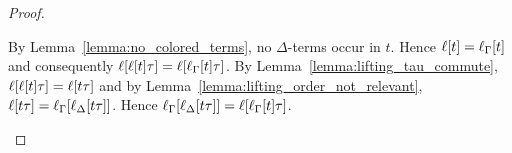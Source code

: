 \documentclass[,%
	draft=false,%
	numbers=noendperiod
	11pt,
	a4paper,
	oneside,%
	openany,
]{memoir}
\begin{document}
\begin{proof}
\begin{description}
			By Lemma~\ref{lemma:no_colored_terms}, no $\Delta$-terms occur in $t$.
			Hence 
			$\ell[t] = \ell_{\Gamma}[t]$ and consequently
			$\ell[\ell[t]\tau] = \ell[\ell_{\Gamma}[t]\tau]$.
			By Lemma~\ref{lemma:lifting_tau_commute}, $\ell[\ell[t]\tau] = \ell[t\tau]$ and by Lemma~\ref{lemma:lifting_order_not_relevant}, $\ell[t\tau] = \ell_{\Gamma}[\ell_{\Delta}[t\tau]]$.
			Hence $\ell_{\Gamma}[\ell_{\Delta}[t\tau]] = \ell[\ell_{\Gamma}[t]\tau]$.
			\begin{comment}
				Hence it suffices to show that for a literal $\lambda$ in $\LIde(C_i)$ or $\LIclde(C_i)$ and its corresponding literal $\kappa$ in $\LI(C_i)$ or $\LIcl(C_i)$ for some $C_i \in \bbar C$
				that $\lifgammanovar{ \lifdeltanovar{\lambda\tau} } = \lifboth{\kappa\tau}$.

				By the induction hypothesis, $\lifgammanovar{\lambda} = \kappa$.
				By Lemma~\ref{lemma:no_colored_terms}, no $\Delta$-terms occur in $\lambda$.
				Hence 
				$\lifboth{\lambda} = \kappa$ and also
				$\lifboth{\lifboth{\lambda}\tau} = \lifboth{\kappa\tau}$.
				By Lemma~\ref{lemma:lifting_tau_commute},
				$\lifboth{\lambda\tau} = \lifboth{\kappa\tau}$, 
				which by Lemma~\ref{lemma:lifting_order_not_relevant} is nothing else than
				$\lifgammanovar{\lifdeltanovar{\lambda\tau}} = \lifboth{\kappa\tau}$.
			\end{comment}
			\begin{comment}

				For the induction step, it suffices to show that for a literal $\lambda$ with $\lifgammanovar{\lambda} = \kappa$
				that $\lifgammanovar{\lifdeltanovar{\lambda} \tau} = \lifboth{\kappa\tau}$.

				We abbreviate\
				$C_1\setminus \{l\}$ by $C_1^*$ and
				$C_2\setminus \{\lnot l'\}$ by $C_2^*$.

				Note that each literal in $\LIclde(C)$ is of the form $\lifdeltanovar{\lambda\tau}$ for some literal $\lambda$ in $\LIclde(C_1)$ or $\LIclde(C_2)$.
				Hence by the induction hypothesis, $\lifgammanovar{\lambda}$ is contained in $\LIcl(C_1)$ or $\LIcl(C_1)$.
				Note that every literal in $\LIcl(C)$ is of this form $\lifboth{\lifgammanovar{\lambda}\tau}$ for some $\lambda$ in $\LIclde(C_1)$ or $\LIclde(C_2)$.
				We show that $\lifboth{\lifgammanovar{\lambda}\tau} = \lifgammanovar{\lifdeltanovar{\lambda\tau}}$.


\end{comment}
\end{description}
\end{proof}
\end{document}
